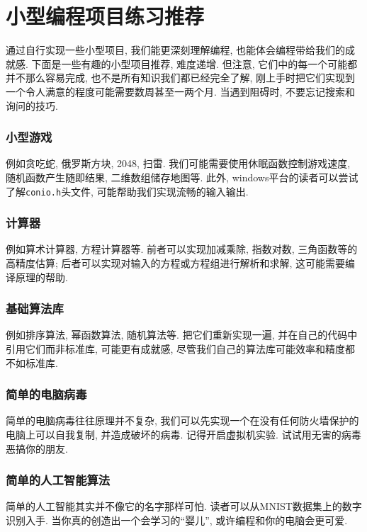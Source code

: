 \chapter{小型编程项目练习推荐} \label{小型编程项目练习推荐}
    通过自行实现一些小型项目, 我们能更深刻理解编程, 也能体会编程带给我们的成就感. 下面是一些有趣的小型项目推荐, 难度递增. 但注意, 它们中的每一个可能都并不那么容易完成, 也不是所有知识我们都已经完全了解, 刚上手时把它们实现到一个令人满意的程度可能需要数周甚至一两个月. 当遇到阻碍时, 不要忘记搜索和询问的技巧.

    \subsection*{小型游戏}
        例如贪吃蛇, 俄罗斯方块, 2048, 扫雷. 我们可能需要使用休眠函数控制游戏速度, 随机函数产生随即结果, 二维数组储存地图等. 此外, windows平台的读者可以尝试了解\texttt{conio.h}头文件, 可能帮助我们实现流畅的输入输出. 

    \subsection*{计算器}
        例如算术计算器, 方程计算器等. 前者可以实现加减乘除, 指数对数, 三角函数等的高精度估算; 后者可以实现对输入的方程或方程组进行解析和求解, 这可能需要编译原理的帮助.

    \subsection*{基础算法库}
        例如排序算法, 幂函数算法, 随机算法等. 把它们重新实现一遍, 并在自己的代码中引用它们而非标准库, 可能更有成就感, 尽管我们自己的算法库可能效率和精度都不如标准库.

    \subsection*{简单的电脑病毒}
        简单的电脑病毒往往原理并不复杂, 我们可以先实现一个在没有任何防火墙保护的电脑上可以自我复制, 并造成破坏的病毒. 记得开启虚拟机实验. 试试用无害的病毒恶搞你的朋友.
    
    \subsection*{简单的人工智能算法}
        简单的人工智能其实并不像它的名字那样可怕. 读者可以从MNIST数据集上的数字识别入手. 当你真的创造出一个会学习的``婴儿'', 或许编程和你的电脑会更可爱.
